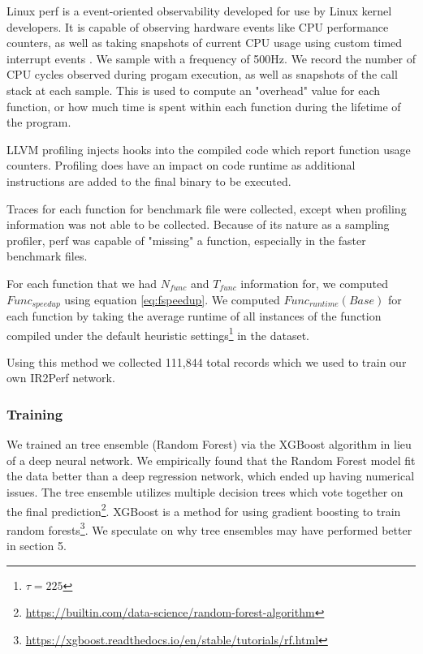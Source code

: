 \documentclass[nohyperref]{article}
\theoremstyle{plain}
\theoremstyle{definition}
\theoremstyle{remark}
\begin{document}
Linux perf is a event-oriented observability developed for use by Linux kernel developers. It is capable of observing hardware events like CPU performance counters, as well as taking snapshots of current CPU usage using custom timed interrupt events \cite{perf}. We sample with a frequency of 500Hz. We record the number of CPU cycles observed during progam execution, as well as snapshots of the call stack at each sample. This is used to compute an "overhead" value for each function, or how much time is spent within each function during the lifetime of the program.

LLVM profiling injects hooks into the compiled code which report function usage counters. Profiling does have an impact on code runtime as additional instructions are added to the final binary to be executed.

Traces for each function for benchmark file were collected, except when profiling information was not able to be collected. Because of its nature as a sampling profiler, perf was capable of "missing" a function, especially in the faster benchmark files.

For each function that  we had $N_{func}$ and $T_{func}$ information for, we computed $Func_{speedup}$ using equation \ref{eq:fspeedup}. We computed $Func_{runtime}(Base)$ for each function by taking the average runtime of all instances of the function compiled under the default heuristic settings\footnote{$\tau = 225$} in the dataset.

Using this method we collected 111,844 total records which we used to train our own IR2Perf network.

\subsubsection{Training}
We trained an tree ensemble (Random Forest) via the XGBoost algorithm in lieu of a deep neural network. We empirically found that the Random Forest model fit the data better than a deep regression network, which ended up having numerical issues. The tree ensemble utilizes multiple decision trees which vote together on the final prediction\footnote{\href{https://builtin.com/data-science/random-forest-algorithm}{https://builtin.com/data-science/random-forest-algorithm}}. XGBoost is a method for using gradient boosting to train random forests\footnote{\href{https://xgboost.readthedocs.io/en/stable/tutorials/rf.html}{https://xgboost.readthedocs.io/en/stable/tutorials/rf.html}}. We speculate on why tree ensembles may have performed better in section 5.
\end{document}
